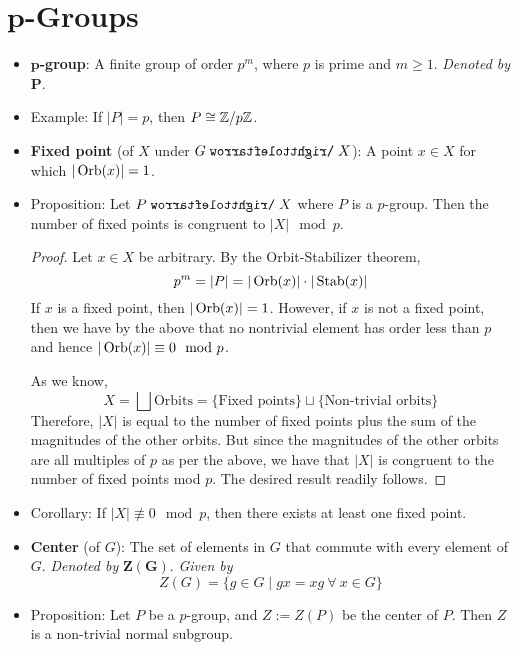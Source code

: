 \documentclass[../notes.tex]{subfiles}
\begin{document}
\section[\texorpdfstring{$p$}{TEXT}-Groups]{\texorpdfstring{$\bm{p}$}{TEXT}-Groups}
\begin{itemize}
    \item {}\textbf{$\bm{p}$-group}: A finite group of order $p^m$, where $p$ is prime and $m\geq 1$. \emph{Denoted by} $\bm{P}$.
    \item Example: If $|P|=p$, then $P\cong\mathbb{Z}/p\mathbb{Z}$.
    \item \textbf{Fixed point} (of $X$ under $G\acts X$): A point $x\in X$ for which $|\operatorname{Orb}(x)|=1$.
    \item Proposition: Let $P\acts X$ where $P$ is a $p$-group. Then the number of fixed points is congruent to $|X|\mod p$.
    \begin{proof}
        Let $x\in X$ be arbitrary. By the Orbit-Stabilizer theorem,
        \begin{equation*}
            p^m = |P| = |\operatorname{Orb}(x)|\cdot|\operatorname{Stab}(x)|
        \end{equation*}
        If $x$ is a fixed point, then $|\operatorname{Orb}(x)|=1$. However, if $x$ is not a fixed point, then we have by the above that no nontrivial element has order less than $p$ and hence $|\operatorname{Orb}(x)|\equiv 0\mod p$.\par
        As we know,
        \begin{equation*}
            X = \bigsqcup\text{Orbits}
            = \{\text{Fixed points}\}\sqcup\{\text{Non-trivial orbits}\}
        \end{equation*}
        Therefore, $|X|$ is equal to the number of fixed points plus the sum of the magnitudes of the other orbits. But since the magnitudes of the other orbits are all multiples of $p$ as per the above, we have that $|X|$ is congruent to the number of fixed points mod $p$. The desired result readily follows.
    \end{proof}
    \item Corollary: If $|X|\not\equiv 0\mod p$, then there exists at least one fixed point.
    \item \textbf{Center} (of $G$): The set of elements in $G$ that commute with every element of $G$. \emph{Denoted by} $\bm{Z(G)}$. \emph{Given by}
    \begin{equation*}
        Z(G) = \{g\in G\mid gx=xg\ \forall\ x\in G\}
    \end{equation*}
    \item Proposition: Let $P$ be a $p$-group, and $Z:=Z(P)$ be the center of $P$. Then $Z$ is a non-trivial normal subgroup.

\end{itemize}
\end{document}
